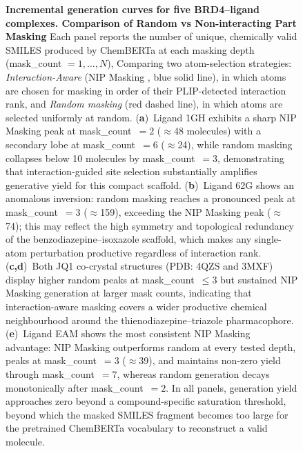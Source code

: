 \documentclass[a4paper,12pt]{article}
\begin{document}
\begin{figure}[htbp]
    \caption{%
        \textbf{Incremental generation curves for five BRD4--ligand complexes. Comparison of Random vs Non-interacting Part Masking }
        Each panel reports the number of unique, chemically valid SMILES
        produced by ChemBERTa at each masking depth (mask\_count $= 1,\ldots,N$),
        Comparing two atom-selection strategies:
        \textit{Interaction-Aware} (NIP Masking , blue solid line), in which atoms are
        chosen for masking in order of their PLIP-detected interaction rank,
        and \textit{Random masking} (red dashed line), in which atoms are
        selected uniformly at random.
        (\textbf{a})~Ligand 1GH exhibits a sharp NIP Masking peak at mask\_count~$= 2$
        ($\approx$48 molecules) with a secondary lobe at mask\_count~$= 6$
        ($\approx$24), while random masking collapses below 10 molecules by
        mask\_count~$= 3$, demonstrating that interaction-guided site selection
        substantially amplifies generative yield for this compact scaffold.
        (\textbf{b})~Ligand 62G shows an anomalous inversion: random masking
        reaches a pronounced peak at mask\_count~$= 3$ ($\approx$159),
        exceeding the NIP Masking peak ($\approx$74); this may reflect the high
        symmetry and topological redundancy of the benzodiazepine--isoxazole
        scaffold, which makes any single-atom perturbation productive
        regardless of interaction rank.
        (\textbf{c,d})~Both JQ1 co-crystal structures (PDB: 4QZS and 3MXF)
        display higher random peaks at mask\_count~$\leq 3$ but sustained NIP Masking 
        generation at larger mask counts, indicating that interaction-aware
        masking covers a wider productive chemical neighbourhood around the
        thienodiazepine--triazole pharmacophore.
        (\textbf{e})~Ligand EAM shows the most consistent NIP Masking advantage:
        NIP Masking outperforms random at every tested depth, peaks at mask\_count~$= 3$
        ($\approx$39), and maintains non-zero yield through mask\_count~$= 7$,
        whereas random generation decays monotonically after mask\_count~$= 2$.
        In all panels, generation yield approaches zero beyond a
        compound-specific saturation threshold, beyond which the masked
        SMILES fragment becomes too large for the pretrained ChemBERTa
        vocabulary to reconstruct a valid molecule.
    }
    \label{fig:incremental_generation_curves}
\end{figure}
\end{document}

